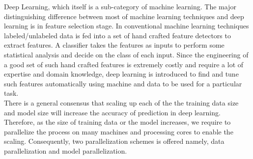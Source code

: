 \documentclass[runningheads,a4paper]{llncs}
\begin{document}
Deep Learning, which itself is a sub-category of machine learning. The major distinguishing difference between most of machine learning techniques and deep learning is in feature selection stage. In conventional machine learning techniques labeled/unlabeled data is fed into a set of hand crafted feature detectors to extract features. A classifier takes the features as inputs to perform some statistical analysis and decide on the class of each input. Since the engineering of a good set of such hand crafted features is extremely costly and require a lot of expertise and domain knowledge, deep learning is introduced to find and tune such features automatically using machine and data to be used for a particular task.\\

There is a general consensus that scaling up each of the the training data size and model size will increase the accuracy of prediction in deep learning. Therefore, as the size of training data or the model increases, we require to parallelize the process on many machines and processing cores to enable the scaling. Consequently, two parallelization schemes is offered namely, data parallelization and model parallelization.\\
\end{document}

